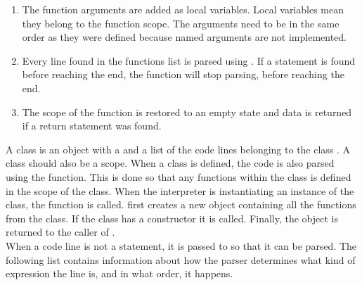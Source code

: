 \begin{enumerate}
    \item The function arguments are added as local variables. Local variables mean they belong to the function scope. The arguments need to be in the same order as they were defined because named arguments are not implemented.
    \item Every line found in the functions  list is parsed using . If a  statement is found before reaching the end, the function will stop parsing, before reaching the end.
    \item The scope of the function is restored to an empty state and data is returned if a return statement was found.
\end{enumerate}
A class is an object with a  and a list of the code lines belonging to the class . A class should also be a scope. When a class is defined, the code is also parsed using the  function. This is done so that any functions within the class is defined in the scope of the class. When the interpreter is instantiating an instance of the class, the  function is called.  first creates a new object containing all the functions from the class. If the class has a constructor it is called. Finally, the object is returned to the caller of .
\\[11pt]
When a code line is not a statement, it is passed to  so that it can be parsed. The following list contains information about how the parser determines what kind of expression the line is, and in what order, it happens.
